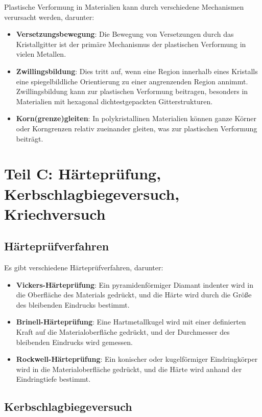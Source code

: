 \documentclass[a4paper,12pt]{article}
\begin{document}
Plastische Verformung in Materialien kann durch verschiedene Mechanismen verursacht werden, darunter:

\begin{itemize}
    \item \textbf{Versetzungsbewegung}: Die Bewegung von Versetzungen durch das Kristallgitter ist der primäre Mechanismus der plastischen Verformung in vielen Metallen.
    \item \textbf{Zwillingsbildung}: Dies tritt auf, wenn eine Region innerhalb eines Kristalls eine spiegelbildliche Orientierung zu einer angrenzenden Region annimmt. Zwillingsbildung kann zur plastischen Verformung beitragen, besonders in Materialien mit hexagonal dichtestgepackten Gitterstrukturen.
    \item \textbf{Korn(grenze)gleiten}: In polykristallinen Materialien können ganze Körner oder Korngrenzen relativ zueinander gleiten, was zur plastischen Verformung beiträgt.
\end{itemize}

\newpage

\section{Teil C: Härteprüfung, Kerbschlagbiegeversuch, Kriechversuch}

\subsection{Härteprüfverfahren}

Es gibt verschiedene Härteprüfverfahren, darunter:
\begin{itemize}
    \item \textbf{Vickers-Härteprüfung}: Ein pyramidenförmiger Diamant indenter wird in die Oberfläche des Materials gedrückt, und die Härte wird durch die Größe des bleibenden Eindrucks bestimmt.
    \item \textbf{Brinell-Härteprüfung}: Eine Hartmetallkugel wird mit einer definierten Kraft auf die Materialoberfläche gedrückt, und der Durchmesser des bleibenden Eindrucks wird gemessen.
    \item \textbf{Rockwell-Härteprüfung}: Ein konischer oder kugelförmiger Eindringkörper wird in die Materialoberfläche gedrückt, und die Härte wird anhand der Eindringtiefe bestimmt.
\end{itemize}

\subsection{Kerbschlagbiegeversuch}
\end{document}
